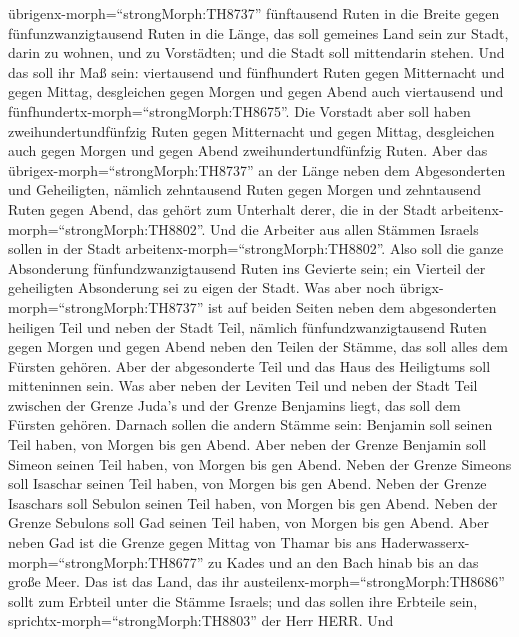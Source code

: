 übrigenx-morph=``strongMorph:TH8737'' fünftausend Ruten in die Breite
gegen fünfunzwanzigtausend Ruten in die Länge, das soll gemeines Land
sein zur Stadt, darin zu wohnen, und zu Vorstädten; und die Stadt soll
mittendarin stehen.  Und das soll ihr Maß sein: viertausend
und fünfhundert Ruten gegen Mitternacht und gegen Mittag, desgleichen
gegen Morgen und gegen Abend auch viertausend und
fünfhundertx-morph=``strongMorph:TH8675''.  Die Vorstadt
aber soll haben zweihundertundfünfzig Ruten gegen Mitternacht und gegen
Mittag, desgleichen auch gegen Morgen und gegen Abend
zweihundertundfünfzig Ruten.  Aber das
übrigex-morph=``strongMorph:TH8737'' an der Länge neben dem
Abgesonderten und Geheiligten, nämlich zehntausend Ruten gegen Morgen
und zehntausend Ruten gegen Abend, das gehört zum Unterhalt derer, die
in der Stadt arbeitenx-morph=``strongMorph:TH8802''.  Und
die Arbeiter aus allen Stämmen Israels sollen in der Stadt
arbeitenx-morph=``strongMorph:TH8802''.  Also soll die
ganze Absonderung fünfundzwanzigtausend Ruten ins Gevierte sein; ein
Vierteil der geheiligten Absonderung sei zu eigen der Stadt.
 Was aber noch übrigx-morph=``strongMorph:TH8737'' ist auf
beiden Seiten neben dem abgesonderten heiligen Teil und neben der Stadt
Teil, nämlich fünfundzwanzigtausend Ruten gegen Morgen und gegen Abend
neben den Teilen der Stämme, das soll alles dem Fürsten gehören. Aber
der abgesonderte Teil und das Haus des Heiligtums soll mitteninnen sein.
 Was aber neben der Leviten Teil und neben der Stadt Teil
zwischen der Grenze Juda's und der Grenze Benjamins liegt, das soll dem
Fürsten gehören.  Darnach sollen die andern Stämme sein:
Benjamin soll seinen Teil haben, von Morgen bis gen Abend. 
Aber neben der Grenze Benjamin soll Simeon seinen Teil haben, von Morgen
bis gen Abend.  Neben der Grenze Simeons soll Isaschar
seinen Teil haben, von Morgen bis gen Abend.  Neben der
Grenze Isaschars soll Sebulon seinen Teil haben, von Morgen bis gen
Abend.  Neben der Grenze Sebulons soll Gad seinen Teil
haben, von Morgen bis gen Abend.  Aber neben Gad ist die
Grenze gegen Mittag von Thamar bis ans
Haderwasserx-morph=``strongMorph:TH8677'' zu Kades und an den Bach hinab
bis an das große Meer.  Das ist das Land, das ihr
austeilenx-morph=``strongMorph:TH8686'' sollt zum Erbteil unter die
Stämme Israels; und das sollen ihre Erbteile sein,
sprichtx-morph=``strongMorph:TH8803'' der Herr HERR.  Und

